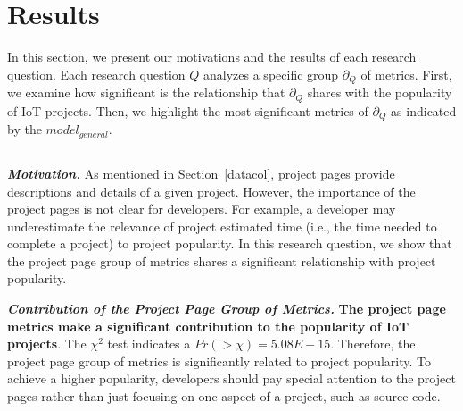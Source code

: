\section{Results}\label{section:results}
\begin{comment}
\end{comment}

In this section, we present our motivations and the results of each research
question. Each research question $Q$ analyzes a specific group $\partial_Q$ of
metrics. First, we examine how significant is the relationship that
$\partial_Q$ shares with the popularity of IoT projects.  Then, we highlight
the most significant metrics of $\partial_Q$ as indicated by the
$model_{general}$.

\subsection*{\bfseries\RQone}

\vspace{0.1cm}

\noindent\textbf{\textit{Motivation.}}
As mentioned in Section~\ref{datacol}, project pages provide descriptions and
details of a given project. However, the importance of the project pages is not
clear for developers. For example, a developer may underestimate the relevance
of project estimated time (i.e., the time needed to complete a project) to
project popularity. In this research question, we show that the project page
group of metrics shares a significant relationship with project popularity.

\vspace{0.1cm}



 

% 

\noindent\textbf{\textit{Contribution of the Project Page Group of Metrics.}}
\textbf{The project page metrics make a significant contribution to the
popularity of IoT projects}. The $\chi^2$ test indicates a
$Pr(>\chi)=5.08E-15$.  Therefore, the project page group of metrics is
significantly related to project popularity. To achieve a higher popularity,
developers should pay special attention to the project pages rather than just
focusing on one aspect of a project, such as source-code.

\vspace{0.1cm}

